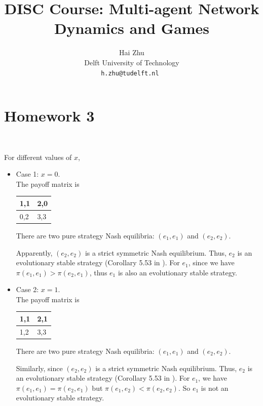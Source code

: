 \documentclass[a4 paper, 12pt]{article}
\title{
        \Large{DISC Course: Multi-agent Network Dynamics and Games}\\
        \vspace{1em}
        \large\tb{Homework 3 \& 4}
}
\author{
        \small Hai Zhu                          \\
        \small Delft University of Technology   \\
        \tt\small h.zhu@tudelft.nl
 }
\date{\small\ti{\today}}
\begin{document}
\maketitle

\section{Homework 3}
~~~~

 For different values of $x$,
\begin{itemize}
        \item Case 1: $x=0$. \\
        The payoff matrix is 
        \begin{center}
                \begin{tabular}{ | m{1em} | m{1em}| } 
                \hline
                1,1& 2,0 \\ 
                \hline
                0,2 & 3,3 \\ 
                \hline
                \end{tabular}
        \end{center}
        There are two pure strategy Nash equilibria: $(e_1,e_1)$ and $(e_2,e_2)$.

        Apparently, $(e_2,e_2)$ is a strict symmetric Nash equilibrium. Thus, $e_2$ is an evolutionary stable strategy (Corollary 5.53 in \cite{b1}). For $e_1$, since we have $\pi(e_1,e_1)>\pi(e_2,e_1)$, thus $e_1$ is also an evolutionary stable strategy.

        \item Case 2: $x=1$. \\
        The payoff matrix is 
        \begin{center}
                \begin{tabular}{ | m{1em} | m{1em}| } 
                \hline
                1,1& 2,1 \\ 
                \hline
                1,2 & 3,3 \\ 
                \hline
                \end{tabular}
        \end{center}
        There are two pure strategy Nash equilibria: $(e_1,e_1)$ and $(e_2,e_2)$.

        Similarly, since $(e_2,e_2)$ is a strict symmetric Nash equilibrium. Thus, $e_2$ is an evolutionary stable strategy (Corollary 5.53 in \cite{b1}). For $e_1$, we have $\pi(e_1,e_1)=\pi(e_2,e_1)$ but $\pi(e_1,e_2)<\pi(e_2,e_2)$. So $e_1$ is not an evolutionary stable strategy.


\end{itemize}
\end{document}
